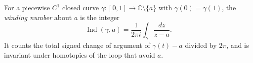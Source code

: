 
For a piecewise $C^1$ closed curve $\gamma:[0,1]\to\mathbb C\setminus\{a\}$ with $\gamma(0)=\gamma(1)$, the \emph{winding number} about $a$ is the integer
\[
\operatorname{Ind}(\gamma,a)=\frac{1}{2\pi i}\int_\gamma\frac{dz}{z-a}.
\]
It counts the total signed change of argument of $\gamma(t)-a$ divided by $2\pi$, and is invariant under homotopies of the loop that avoid $a$.
